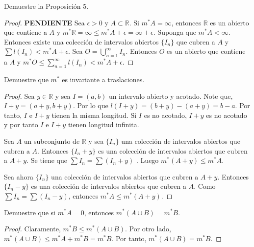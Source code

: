 \documentclass[12pt]{article}
\newcommand{\R}{\mathbb{R}}
\newenvironment{problem}[2][Problema]{\begin{trivlist}
\item[\hskip \labelsep {\bfseries #1}\hskip \labelsep {\bfseries #2.}]}{\end{trivlist}}
\begin{document}
\begin{problem}{6}
Demuestre la Proposición 5.
\end{problem}
\begin{proof} \textbf{PENDIENTE}
Sea $\epsilon >0 $ y $A \subset \R$. Si $m^*A = \infty$, entonces $\R$ es un abierto que contiene a $A$ y $m^*\R = \infty \leq m^* A + \epsilon = \infty + \epsilon.$ Suponga que $m^* A < \infty$. Entonces existe una colección de intervalos abiertos $\{I_n\}$ que cubren a $A$ y $\sum l(I_n) < m^* A + \epsilon.$ Sea $O = \bigcup_{n=1}^{\infty} I_n$. Entonces $O$ es un abierto que contiene a $A$ y $m^*O \leq \sum_{n=1}^{\infty} l(I_n) < m^* A + \epsilon.$


\end{proof}



\begin{problem}{7}
Demuestre que $m^*$ es invariante a traslaciones.
\end{problem}
\begin{proof}
Sea $y \in \R$ y sea $I = (a, b)$ un intervalo abierto y acotado. Note que, $I + y = (a + y, b + y)$. Por lo que $l(I + y) = (b+y) - (a + y) = b - a$. Por tanto, $I$ e $I + y$ tienen la misma longitud. Si $I$ es no acotado, $I + y$ es no acotado y por tanto $I$ e $I+y$ tienen longitud infinita. 

Sea $A$ un subconjunto de $\R$ y sea $\{I_n\}$ una colección de intervalos abiertos que cubren a $A$. Entonces $\{I_n + y \}$ es una colección de intervalos abiertos que cubren a $A + y$. Se tiene que $\sum I_n = \sum (I_n + y) $ . Luego  $m^* (A + y) \leq m^* A.$


Sea ahora $\{I_n\}$ una colección de intervalos abiertos que cubren a $A + y$. Entonces $\{I_n - y\}$ es una colección de intervalos abiertos que cubren a $A$. Como $\sum I_n = \sum(I_n - y)$, entonces $m^*A \leq m^*(A + y).$

\end{proof}




\begin{problem}{8}
Demuestre que si $m^* A = 0$, entonces $m^* (A \cup B) = m^* B$.
\end{problem}

\begin{proof}
Claramente, $m^* B \leq m^* (A \cup B).$ Por otro lado, $m^*(A \cup B) \leq m^* A + m^*B = m^* B.$ Por tanto, $m^* (A \cup B) = m^* B$.

\end{proof}
\end{document}

